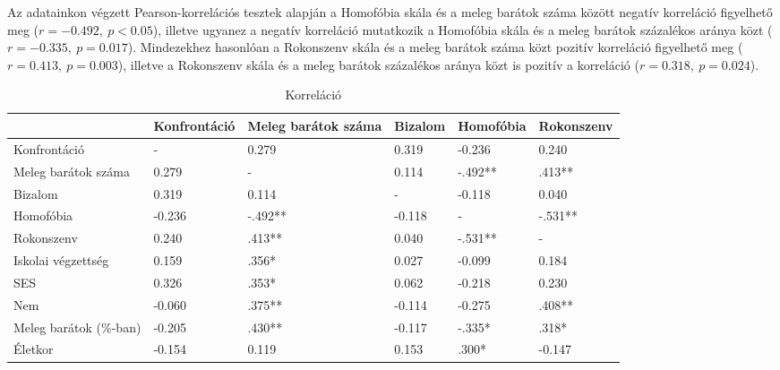 Az adatainkon végzett Pearson-korrelációs tesztek alapján a Homofóbia skála és a meleg barátok száma között negatív korreláció figyelhető meg ($r= -0.492, \  p<0.05$), illetve ugyanez a negatív korreláció mutatkozik a Homofóbia skála és a meleg barátok százalékos aránya közt ($r= -0.335, \  p=0.017$). Mindezekhez hasonlóan a Rokonszenv skála és a meleg barátok száma közt pozitív korreláció figyelhető meg ($r= 0.413, \  p=0.003$), illetve a Rokonszenv skála és a meleg barátok százalékos aránya közt is pozitív a korreláció ($r=0.318, \  p=0.024$). 


\begin{table}[h]
	\small
	\begin{tabular}{@{}lp{2cm}p{2cm}lp{2cm}l@{}}
		\toprule
		& Konfrontáció & Meleg barátok száma & Bizalom & Homofóbia & Rokonszenv \\ \midrule
		Konfrontáció            & -            & 0.279               & 0.319   & -0.236    & 0.240      \\
		Meleg barátok száma     & 0.279        & -                   & 0.114   & -.492**   & .413**     \\
		Bizalom                 & 0.319        & 0.114               & -       & -0.118    & 0.040      \\
		Homofóbia               & -0.236       & -.492**             & -0.118  & -         & -.531**    \\
		Rokonszenv              & 0.240        & .413**              & 0.040   & -.531**   & -          \\
		Iskolai végzettség      & 0.159        & .356*               & 0.027   & -0.099    & 0.184      \\
		SES & 0.326        & .353*               & 0.062   & -0.218    & 0.230      \\
		Nem                     & -0.060       & .375**              & -0.114  & -0.275    & .408**     \\
		Meleg barátok (\%-ban)  & -0.205       & .430**              & -0.117  & -.335*    & .318*      \\
		Életkor                 & -0.154       & 0.119               & 0.153   & .300*     & -0.147    
	\end{tabular}
	\caption{Korreláció}
	\label{table:2}
\end{table}


